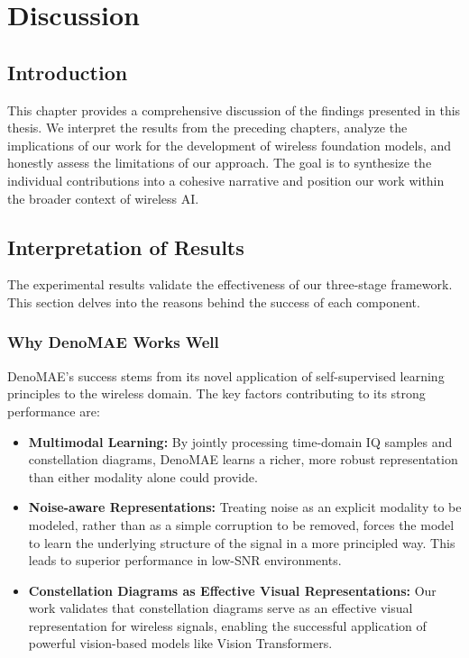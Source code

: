 %
%

\chapter{Discussion}
\label{chap:discussion}

\section{Introduction}
This chapter provides a comprehensive discussion of the findings presented in this thesis. We interpret the results from the preceding chapters, analyze the implications of our work for the development of wireless foundation models, and honestly assess the limitations of our approach. The goal is to synthesize the individual contributions into a cohesive narrative and position our work within the broader context of wireless AI.

\section{Interpretation of Results}
The experimental results validate the effectiveness of our three-stage framework. This section delves into the reasons behind the success of each component.

\subsection{Why DenoMAE Works Well}
DenoMAE's success stems from its novel application of self-supervised learning principles to the wireless domain. The key factors contributing to its strong performance are:
\begin{itemize}
    \item \textbf{Multimodal Learning:} By jointly processing time-domain IQ samples and constellation diagrams, DenoMAE learns a richer, more robust representation than either modality alone could provide.
    \item \textbf{Noise-aware Representations:} Treating noise as an explicit modality to be modeled, rather than as a simple corruption to be removed, forces the model to learn the underlying structure of the signal in a more principled way. This leads to superior performance in low-SNR environments.
    \item \textbf{Constellation Diagrams as Effective Visual Representations:} Our work validates that constellation diagrams serve as an effective visual representation for wireless signals, enabling the successful application of powerful vision-based models like Vision Transformers.
\end{itemize}

